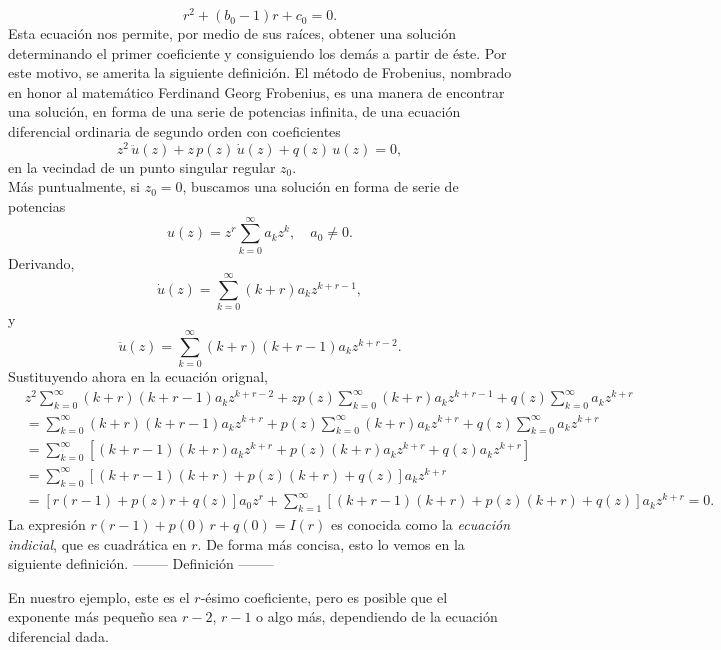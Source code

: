 \documentclass[main.tex]{subfiles}
\begin{document}
\[
  r^{2}+(b_{0}-1)r+c_{0}=0.
\]
Esta ecuación nos permite, por medio de sus raíces, obtener una solución determinando el primer coeficiente y consiguiendo los demás a partir de éste. Por este motivo, se amerita la siguiente definición.
El método de Frobenius, nombrado en honor al matemático Ferdinand Georg Frobenius, es una manera de encontrar una solución, en forma de una serie de potencias infinita, de una ecuación diferencial ordinaria de segundo orden con coeficientes
\[
  z^{2}\,\ddot{u}(z)+z\,p(z)\,\dot{u}(z)+q(z)\,u(z)=0,
\]
en la vecindad de un punto singular regular $z_{0}$.\\
\indent Más puntualmente, si $z_{0}=0$, buscamos una solución en forma de serie de potencias
\[
  u(z)=z^{r}\sum_{k=0}^{\infty}a_{k}z^{k},\quad a_{0}\neq0.
\]
Derivando,
\[
  \dot{u}(z)=\sum_{k=0}^{\infty}(k+r)a_{k}z^{k+r-1},
\]
y
\[
  \ddot{u}(z)=\sum_{k=0}^{\infty}(k+r)(k+r-1)a_{k}z^{k+r-2}.
\]
Sustituyendo ahora en la ecuación orignal,
\begin{align*}
  &z^{2}\sum_{k=0}^{\infty}(k+r)(k+r-1)a_{k}z^{k+r-2}+zp(z)\sum_{k=0}^{\infty}(k+r)a_{k}z^{k+r-1}+q(z)\sum_{k=0}^{\infty}a_{k}z^{k+r}\\
  &=\sum_{k=0}^{\infty}(k+r)(k+r-1)a_{k}z^{k+r}+p(z)\sum_{k=0}^{\infty}(k+r)a_{k}z^{k+r}+q(z)\sum_{k=0}^{\infty}a_{k}z^{k+r}\\
  &=\sum_{k=0}^{\infty}\left[(k+r-1)(k+r)a_{k}z^{k+r}+p(z)(k+r)a_{k}z^{k+r}+q(z)a_{k}z^{k+r}\right]\\
  &=\sum_{k=0}^{\infty}\left[(k+r-1)(k+r)+p(z)(k+r)+q(z)\right]a_{k}z^{k+r}\\
  &=[r(r-1)+p(z)r+q(z)]a_{0}z^{r}+\sum_{k=1}^{\infty}[(k+r-1)(k+r)+p(z)(k+r)+q(z)]a_{k}z^{k+r}=0.
\end{align*}
La expresión $r(r-1)+p(0)\,r+q(0)=I(r)$ es conocida como la \textit{ecuación indicial}, que es cuadrática en $r$. De forma más concisa, esto lo vemos en la siguiente definición.
-------- Definición --------%
\begin{def.}\label{d1.2} %
\end{def.}
En nuestro ejemplo, este es el $r$-ésimo coeficiente, pero es posible que el exponente más pequeño sea $r-2$, $r-1$ o algo más, dependiendo de la ecuación diferencial dada.\\
\end{document}
